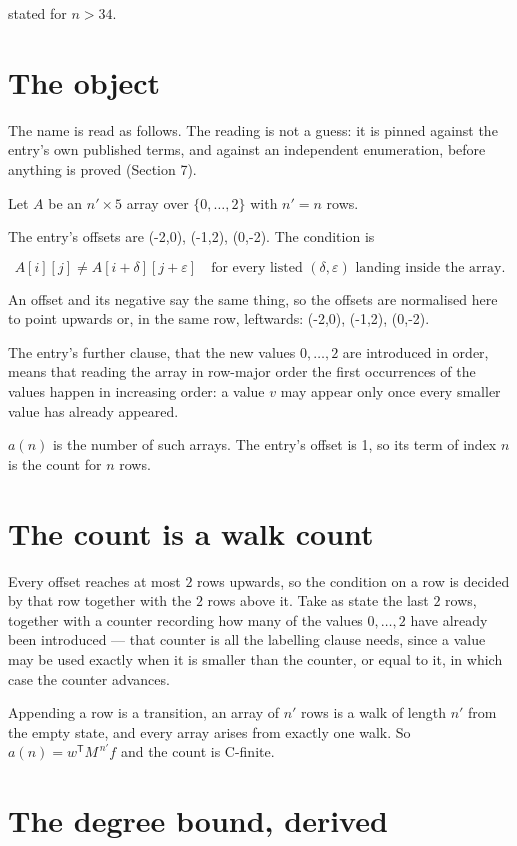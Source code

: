 \documentclass[11pt]{article}
\theoremstyle{definition}
\begin{document}
stated for $n > 34$.

\section{The object}

The name is read as follows. The reading is not a guess: it is pinned against the entry's own published terms, and against an independent enumeration, before anything is proved (Section 7).

Let $A$ be an $n' \times 5$ array over $\{0,\dots,2\}$ with $n' = n$ rows.

The entry's offsets are (-2,0), (-1,2), (0,-2). The condition is

\[A[i][j] \ne A[i{+}\delta][j{+}\varepsilon]\quad\text{for every listed }(\delta,\varepsilon)\text{ landing inside the array.}\]

An offset and its negative say the same thing, so the offsets are normalised here to point upwards or, in the same row, leftwards: (-2,0), (-1,2), (0,-2).

The entry's further clause, that the new values $0,\dots,2$ are introduced in order, means that reading the array in row-major order the first occurrences of the values happen in increasing order: a value $v$ may appear only once every smaller value has already appeared.

$a(n)$ is the number of such arrays. The entry's offset is 1, so its term of index $n$ is the count for $n$ rows.

\section{The count is a walk count}

Every offset reaches at most $2$ rows upwards, so the condition on a row is decided by that row together with the $2$ rows above it. Take as state the last $2$ rows, together with a counter recording how many of the values $0,\dots,2$ have already been introduced --- that counter is all the labelling clause needs, since a value may be used exactly when it is smaller than the counter, or equal to it, in which case the counter advances.

Appending a row is a transition, an array of $n'$ rows is a walk of length $n'$ from the empty state, and every array arises from exactly one walk. So $a(n) = w^{\mathsf T}M^{\,n'}f$ and the count is C-finite.

\section{The degree bound, derived}
\end{document}
